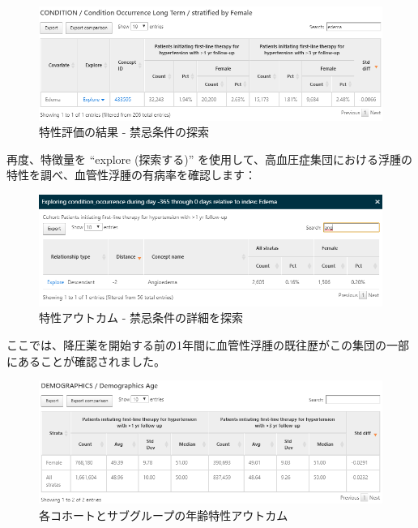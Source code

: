 \documentclass[
  11pt]{book}
\theoremstyle{definition}
\theoremstyle{definition}
\theoremstyle{definition}
\theoremstyle{definition}
\theoremstyle{remark}
\begin{document}
\begin{figure}

{\centering \includegraphics[width=1\linewidth]{images/Characterization/atlasCharacterizationResultsContra} 

}

\caption{特性評価の結果 - 禁忌条件の探索}\label{fig:atlasCharacterizationResultsContra}
\end{figure}

再度、特徴量を ``explore (探索する)'' を使用して、高血圧症集団における浮腫の特性を調べ、血管性浮腫の有病率を確認します：

\begin{figure}

{\centering \includegraphics[width=1\linewidth]{images/Characterization/atlasCharacterizationResultsContraExplore} 

}

\caption{特性アウトカム - 禁忌条件の詳細を探索}\label{fig:atlasCharacterizationResultsContraExplore}
\end{figure}

ここでは、降圧薬を開始する前の1年間に血管性浮腫の既往歴がこの集団の一部にあることが確認されました。

\begin{figure}

{\centering \includegraphics[width=1\linewidth]{images/Characterization/atlasCharacterizationResultsContinuous} 

}

\caption{各コホートとサブグループの年齢特性アウトカム}\label{fig:atlasCharacterizationResultsContinuous}
\end{figure}
\end{document}
